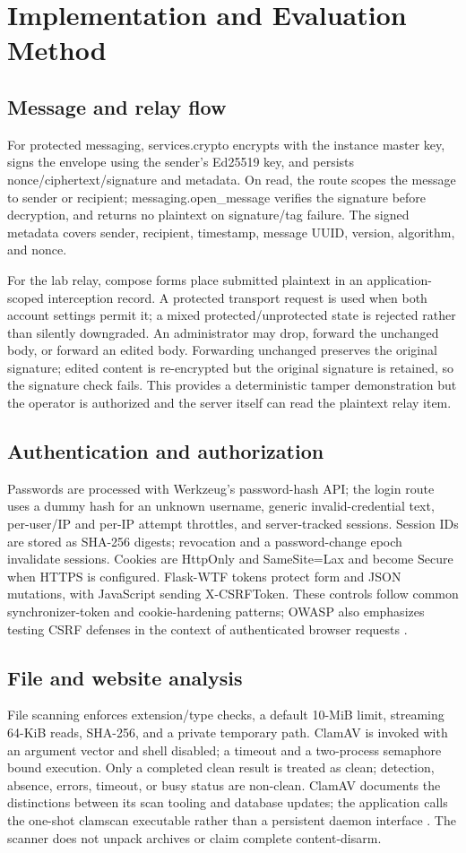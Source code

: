 \documentclass[conference]{IEEEtran}
\begin{document}
\section{Implementation and Evaluation Method}
\subsection{Message and relay flow}
For protected messaging, services.crypto encrypts with the instance master key, signs the envelope using the sender's Ed25519 key, and persists nonce/ciphertext/signature and metadata. On read, the route scopes the message to sender or recipient; messaging.open\_message verifies the signature before decryption, and returns no plaintext on signature/tag failure. The signed metadata covers sender, recipient, timestamp, message UUID, version, algorithm, and nonce.

For the lab relay, compose forms place submitted plaintext in an application-scoped interception record. A protected transport request is used when both account settings permit it; a mixed protected/unprotected state is rejected rather than silently downgraded. An administrator may drop, forward the unchanged body, or forward an edited body. Forwarding unchanged preserves the original signature; edited content is re-encrypted but the original signature is retained, so the signature check fails. This provides a deterministic tamper demonstration but the operator is authorized and the server itself can read the plaintext relay item.

\subsection{Authentication and authorization}
Passwords are processed with Werkzeug's password-hash API; the login route uses a dummy hash for an unknown username, generic invalid-credential text, per-user/IP and per-IP attempt throttles, and server-tracked sessions. Session IDs are stored as SHA-256 digests; revocation and a password-change epoch invalidate sessions. Cookies are HttpOnly and SameSite=Lax and become Secure when HTTPS is configured. Flask-WTF tokens protect form and JSON mutations, with JavaScript sending X-CSRFToken. These controls follow common synchronizer-token and cookie-hardening patterns; OWASP also emphasizes testing CSRF defenses in the context of authenticated browser requests \cite{owaspcsrf}.

\subsection{File and website analysis}
File scanning enforces extension/type checks, a default 10-MiB limit, streaming 64-KiB reads, SHA-256, and a private temporary path. ClamAV is invoked with an argument vector and shell disabled; a timeout and a two-process semaphore bound execution. Only a completed clean result is treated as clean; detection, absence, errors, timeout, or busy status are non-clean. ClamAV documents the distinctions between its scan tooling and database updates; the application calls the one-shot clamscan executable rather than a persistent daemon interface \cite{clamav}. The scanner does not unpack archives or claim complete content-disarm.
\end{document}
